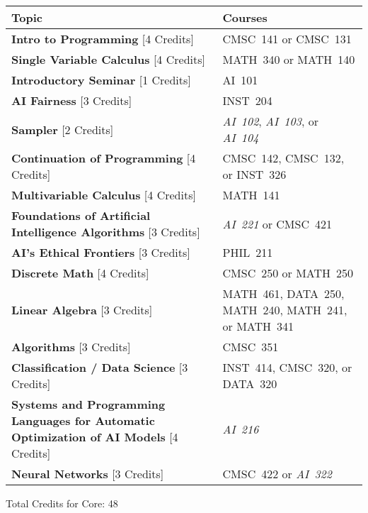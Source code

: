 \begin{longtable}{p{7cm}>{\raggedleft\arraybackslash}p{7cm}}
Topic & Courses \\
\toprule
\textbf{Intro to Programming} [4 Credits] & CMSC~141 or CMSC~131           \\
\textbf{Single Variable Calculus} [4 Credits] & MATH~340 or MATH~140       \\
\textbf{Introductory Seminar} [1 Credits] & AI~101                         \\
\textbf{AI Fairness} [3 Credits] & INST~204                                \\
\textbf{Sampler} [2 Credits] & \textit{AI~102}, \textit{AI~103}, or \textit{AI~104} \\
\textbf{Continuation of Programming} [4 Credits] & CMSC~142, CMSC~132, or INST~326 \\
\textbf{Multivariable Calculus} [4 Credits] & MATH~141                     \\
\textbf{Foundations of Artificial Intelligence Algorithms} [3 Credits] & \textit{AI~221} or CMSC~421 \\
\textbf{AI's Ethical Frontiers} [3 Credits] & PHIL~211                     \\
\textbf{Discrete Math} [4 Credits] & CMSC~250 or MATH~250                  \\
\textbf{Linear Algebra} [3 Credits] & MATH~461, DATA~250, MATH~240, MATH~241, or MATH~341 \\
\textbf{Algorithms} [3 Credits] & CMSC~351                                 \\
\textbf{Classification / Data Science} [3 Credits] & INST~414, CMSC~320, or DATA~320 \\
\textbf{Systems and Programming Languages for Automatic Optimization of AI Models} [4 Credits] & \textit{AI~216} \\
\textbf{Neural Networks} [3 Credits] & CMSC~422 or \textit{AI~322}         \\
\bottomrule
\end{longtable}
Total Credits for Core: 48

